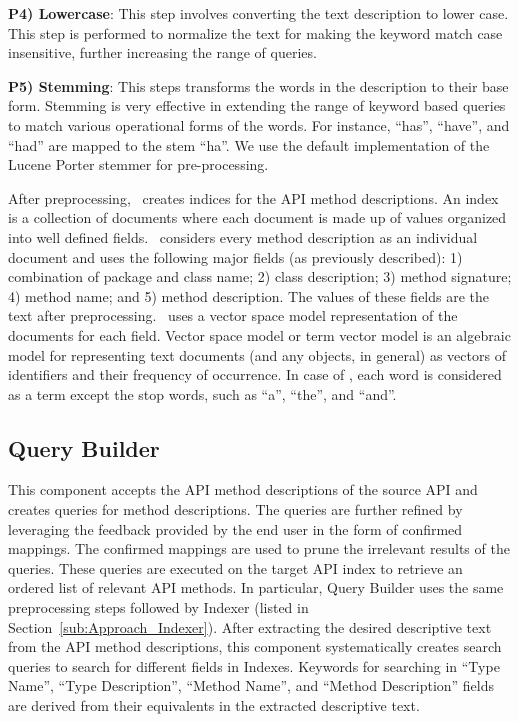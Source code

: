 \textbf{P4) Lowercase}: This step involves converting the text description to lower case. This step is performed to normalize the text for making the keyword match case insensitive, further increasing the range of queries.
	
\textbf{P5) Stemming}: This steps transforms the words in the description to their base form. Stemming is very effective in extending the range of keyword based queries to match various operational forms of the words. For instance, ``has'', ``have'', and ``had'' are mapped to the stem ``ha''. We use the default implementation of the Lucene Porter stemmer for pre-processing. 
	


After preprocessing, \tool\ creates indices for the API method descriptions.
An index is a collection of documents where each document is made up of 
values organized into well defined fields.
\tool\ considers every method description as an individual document and 
uses the following major fields (as previously described):
1) combination of package and class name;
2) class description;
3) method signature;
4) method name; and
5) method description.
The values of these fields are the text after preprocessing.
\tool\ uses a vector space model representation of the documents for each field. 
Vector space model or term vector model is an algebraic model for representing text documents (and any objects, in general) as vectors of identifiers and their frequency of occurrence. 
In case of \tool, each word is considered as a term except the stop words, such as ``a'', ``the'', and ``and''.


  

\subsection{Query Builder}
\label{sub:Approach_Searcher}

This component accepts the API method descriptions of the source API
and creates queries for method descriptions.
The queries are further refined by leveraging the feedback provided by the end user in the form of confirmed mappings.
The confirmed mappings are used to prune the irrelevant results of the queries.
These queries are executed on the target API index to retrieve 
an ordered list of relevant API methods.
In particular, Query Builder uses the same preprocessing steps followed by Indexer
(listed in Section~\ref{sub:Approach_Indexer}).
After extracting the desired descriptive text from the API method descriptions,
this component systematically creates search queries to search for different fields in Indexes.
Keywords for searching in ``Type Name'', ``Type Description'', ``Method Name'', and ``Method Description'' fields are derived from their equivalents in the extracted descriptive text.



